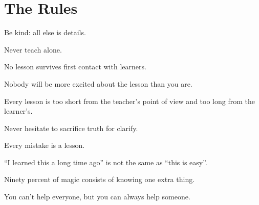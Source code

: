 \chapter*{The Rules}

\begin{genumerate}

\item
  Be kind: all else is details.

\item
  Never teach alone.

\item
  No lesson survives first contact with learners.

\item
  Nobody will be more excited about the lesson than you are.

\item
  Every lesson is too short from the teacher's point of view and too
  long from the learner's.

\item
  Never hesitate to sacrifice truth for clarify.

\item
  Every mistake is a lesson.

\item
  ``I learned this a long time ago'' is not the same as ``this is
  easy''.

\item
  Ninety percent of magic consists of knowing one extra thing.

\item
  You can't help everyone, but you can always help someone.

\end{genumerate}
